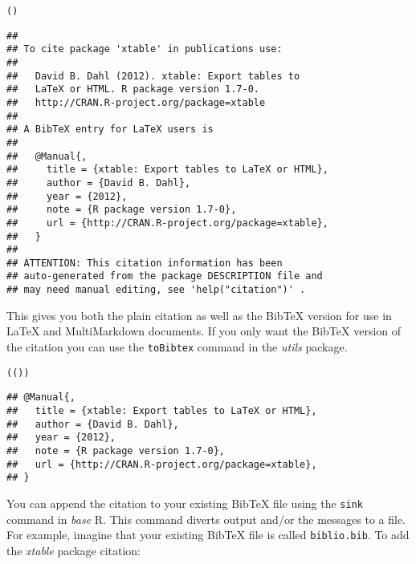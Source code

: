\begin{knitrout}
\color{fgcolor}\begin{kframe}
\begin{alltt}
()
\end{alltt}
\begin{verbatim}
## 
## To cite package 'xtable' in publications use:
## 
##   David B. Dahl (2012). xtable: Export tables to
##   LaTeX or HTML. R package version 1.7-0.
##   http://CRAN.R-project.org/package=xtable
## 
## A BibTeX entry for LaTeX users is
## 
##   @Manual{,
##     title = {xtable: Export tables to LaTeX or HTML},
##     author = {David B. Dahl},
##     year = {2012},
##     note = {R package version 1.7-0},
##     url = {http://CRAN.R-project.org/package=xtable},
##   }
## 
## ATTENTION: This citation information has been
## auto-generated from the package DESCRIPTION file and
## may need manual editing, see 'help("citation")' .
\end{verbatim}
\end{kframe}
\end{knitrout}


\noindent This gives you both the plain citation as well as the BibTeX version for use in LaTeX and MultiMarkdown documents. If you only want the BibTeX version of the citation you can use the \texttt{toBibtex} command in the \emph{utils} package.

\begin{knitrout}
\color{fgcolor}\begin{kframe}
\begin{alltt}
(())
\end{alltt}
\begin{verbatim}
## @Manual{,
##   title = {xtable: Export tables to LaTeX or HTML},
##   author = {David B. Dahl},
##   year = {2012},
##   note = {R package version 1.7-0},
##   url = {http://CRAN.R-project.org/package=xtable},
## }
\end{verbatim}
\end{kframe}
\end{knitrout}


\noindent You can append the citation to your existing BibTeX file using the \texttt{sink} command in \emph{base} R. This command diverts output and/or the messages to a file. For example, imagine that your existing BibTeX file is called \texttt{biblio.bib}. To add the \emph{xtable} package citation:

